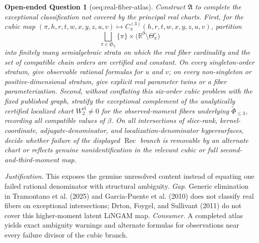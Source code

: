 \documentclass{article}
\newtheorem{openendedquestion}{Open-ended Question}
\begin{document}
\begin{openendedquestion}[oeq:real-fiber-atlas]\label{oeq:real-fiber-atlas}
Construct \(\mathfrak A\) to complete the exceptional classification not covered by the principal real charts.  First, for the cubic map \((\pi,h,r,t,w,x,y,z,u,v)\mapsto C_{\pi}^{(3)}(h,r,t,w,x,y,z,u,v)\), partition
\[
\bigsqcup_{\pi\in\mathfrak S_3}\{\pi\}\times
\bigl(\mathbb R^9\setminus\Theta_{\pi}^{\circ}\bigr)
\]
into finitely many semialgebraic strata on which the real fiber cardinality and the set of compatible chain orders are certified and constant.  On every singleton-order stratum, give observable rational formulas for \(u\) and \(v\); on every non-singleton or positive-dimensional stratum, give explicit real parameter twins or a fiber parameterization.  Second, without conflating this six-order cubic problem with the fixed published graph, stratify the exceptional complement of the analytically certified localized chart \(W_2^{\mathrm{el}}\ne0\) for the observed-moment fibers underlying \(\widetilde\Phi_{\le3}\), recording all compatible values of \(\beta\).  On all intersections of slice-rank, kernel-coordinate, adjugate-denominator, and localization-denominator hypersurfaces, decide whether failure of the displayed \(\operatorname{Rec}\) branch is removable by an alternate chart or reflects genuine nonidentification in the relevant cubic or full second-and-third-moment map.
\end{openendedquestion}
\par\smallskip\noindent \textit{Justification.} This exposes the genuine unresolved content instead of equating one failed rational denominator with structural ambiguity. \textit{Gap.} Generic elimination in Tramontano et al. (2025) and Garcia-Puente et al. (2010) does not classify real fibers on exceptional intersections; Drton, Foygel, and Sullivant (2011) do not cover this higher-moment latent LiNGAM map. \textit{Consumer.} A completed atlas yields exact ambiguity warnings and alternate formulas for observations near every failure divisor of the cubic branch.
\end{document}
